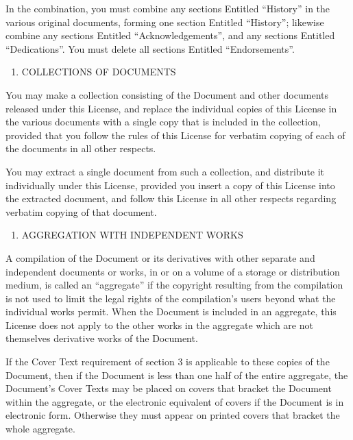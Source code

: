 \documentclass[12pt,a4paperpaper,]{report}
\providecommand{\tightlist}{%
  \setlength{\itemsep}{0pt}\setlength{\parskip}{0pt}}
\begin{document}
In the combination, you must combine any sections Entitled ``History''
in the various original documents, forming one section Entitled
``History''; likewise combine any sections Entitled
``Acknowledgements'', and any sections Entitled ``Dedications''. You
must delete all sections Entitled ``Endorsements''.

\begin{enumerate}
\def\labelenumi{\arabic{enumi}.}
\setcounter{enumi}{5}
\tightlist
\item
  COLLECTIONS OF DOCUMENTS
\end{enumerate}

You may make a collection consisting of the Document and other documents
released under this License, and replace the individual copies of this
License in the various documents with a single copy that is included in
the collection, provided that you follow the rules of this License for
verbatim copying of each of the documents in all other respects.

You may extract a single document from such a collection, and distribute
it individually under this License, provided you insert a copy of this
License into the extracted document, and follow this License in all
other respects regarding verbatim copying of that document.

\begin{enumerate}
\def\labelenumi{\arabic{enumi}.}
\setcounter{enumi}{6}
\tightlist
\item
  AGGREGATION WITH INDEPENDENT WORKS
\end{enumerate}

A compilation of the Document or its derivatives with other separate and
independent documents or works, in or on a volume of a storage or
distribution medium, is called an ``aggregate'' if the copyright
resulting from the compilation is not used to limit the legal rights of
the compilation's users beyond what the individual works permit. When
the Document is included in an aggregate, this License does not apply to
the other works in the aggregate which are not themselves derivative
works of the Document.

If the Cover Text requirement of section 3 is applicable to these copies
of the Document, then if the Document is less than one half of the
entire aggregate, the Document's Cover Texts may be placed on covers
that bracket the Document within the aggregate, or the electronic
equivalent of covers if the Document is in electronic form. Otherwise
they must appear on printed covers that bracket the whole aggregate.
\end{document}
